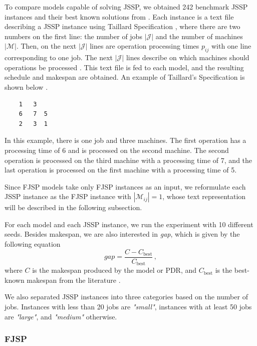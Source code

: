 To compare models capable of solving JSSP, we obtained 242 benchmark JSSP instances and their best known solutions from \cite{jssp_benchmarks}. Each instance is a text file describing a JSSP instance using Taillard Specification \cite{taillard_specification}, where there are two numbers on the first line: the number of jobs $|\mathcal{J}|$ and the number of machines $|\mathcal{M}|$. Then, on the next $|\mathcal{J}|$ lines are operation processing times $p_{ij}$ with one line corresponding to one job. The next $|\mathcal{J}|$ lines describe on which machines should operations be processed \cite{jssp_benchmarks}. This text file is fed to each model, and the resulting schedule and makespan are obtained.  An example of Taillard's Specification is shown below \cite{jssp_benchmarks}.
\begin{verbatim}
    1   3
    6   7  5
    2   3  1    
\end{verbatim}
In this example, there is one job and three machines. The first operation has a processing time of 6 and is processed on the second machine. The second operation is processed on the third machine with a processing time of 7, and the last operation is processed on the first machine with a processing time of 5.
\par
Since FJSP models take only FJSP instances as an input, we reformulate each JSSP instance as the FJSP instance with $|\mathcal{M}_{ij}| = 1$, whose text representation will be described in the following subsection. 
\par
For each model and each JSSP instance, we run the experiment with 10 different seeds. Besides makespan, we are also interested in \textit{gap}, which is given by the following equation
\begin{equation}
    gap  = \frac{C - C_\text{best}}{C_\text{best}} \, ,
\end{equation}
where $C$ is the makespan produced by the model or PDR, and $C_\text{best}$ is the best-known makespan from the literature \cite{jssp_benchmarks}.
\par
We also separated JSSP instances into three categories based on the number of jobs. Instances with less than 20 jobs are \textit{"small"}, instances with at least 50 jobs are \textit{"large"}, and \textit{"medium"} otherwise.

\subsubsection*{FJSP}

